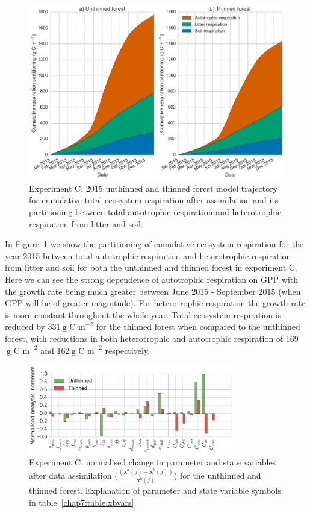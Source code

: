 \begin{figure}[ht]
    \centering
        \includegraphics[width=\textwidth]{chapter/chapter7/resp_partc.pdf}
    \caption{Experiment C: 2015 unthinned and thinned forest model trajectory for cumulative total ecosystem respiration after assimilation and its partitioning between total autotrophic respiration and heterotrophic respiration from litter and soil.} \label{chap7:fig:rt_part}
\end{figure}

In Figure~\ref{chap7:fig:rt_part} we show the partitioning of cumulative ecosystem respiration for the year 2015 between total autotrophic respiration and heterotrophic respiration from litter and soil for both the unthinned and thinned forest in experiment C. Here we can see the strong dependence of autotrophic respiration on GPP with the growth rate being much greater between June 2015 - September 2015 (when GPP will be of greater magnitude). For heterotrophic respiration the growth rate is more constant throughout the whole year. Total ecosystem respiration is reduced by 331\(~\text{g C m}^{-2}\) for the thinned forest when compared to the unthinned forest, with reductions in both heterotrophic and autotrophic respiration of 169\(~\text{g C m}^{-2}\) and 162\(~\text{g C m}^{-2}\) respectively.    

\begin{figure}[ht]
    \centering
    \includegraphics[width=0.8\textwidth]{chapter/chapter7/xa_incc.pdf}
    \caption{Experiment C: normalised change in parameter and state variables after data assimilation \big($\frac{(\textbf{x}^a(j) - \textbf{x}^b(j))}{\textbf{x}^b(j)}$\big) for the unthinned and thinned forest. Explanation of parameter and state variable symbols in table~\ref{chap7:table:xbvars}.}
    \label{chap7:fig:xa_inc}
\end{figure}

